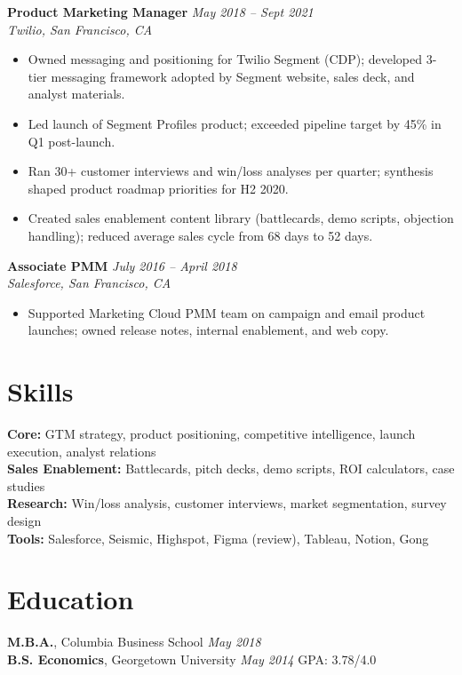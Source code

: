 \documentclass[11pt,a4paper]{article}
\begin{document}
\vspace{4pt}
\noindent\textbf{Product Marketing Manager} \hfill \textit{May 2018 -- Sept 2021}\\
\textit{Twilio, San Francisco, CA}
\begin{itemize}
  \item Owned messaging and positioning for Twilio Segment (CDP); developed 3-tier messaging framework adopted by Segment website, sales deck, and analyst materials.
  \item Led launch of Segment Profiles product; exceeded pipeline target by 45\% in Q1 post-launch.
  \item Ran 30+ customer interviews and win/loss analyses per quarter; synthesis shaped product roadmap priorities for H2 2020.
  \item Created sales enablement content library (battlecards, demo scripts, objection handling); reduced average sales cycle from 68 days to 52 days.
\end{itemize}

\vspace{4pt}
\noindent\textbf{Associate PMM} \hfill \textit{July 2016 -- April 2018}\\
\textit{Salesforce, San Francisco, CA}
\begin{itemize}
  \item Supported Marketing Cloud PMM team on campaign and email product launches; owned release notes, internal enablement, and web copy.
\end{itemize}

\section{Skills}
\textbf{Core:} GTM strategy, product positioning, competitive intelligence, launch execution, analyst relations\\
\textbf{Sales Enablement:} Battlecards, pitch decks, demo scripts, ROI calculators, case studies\\
\textbf{Research:} Win/loss analysis, customer interviews, market segmentation, survey design\\
\textbf{Tools:} Salesforce, Seismic, Highspot, Figma (review), Tableau, Notion, Gong

\section{Education}
\textbf{M.B.A.}, Columbia Business School \hfill \textit{May 2018}\\
\textbf{B.S. Economics}, Georgetown University \hfill \textit{May 2014} \quad GPA: 3.78/4.0
\end{document}
